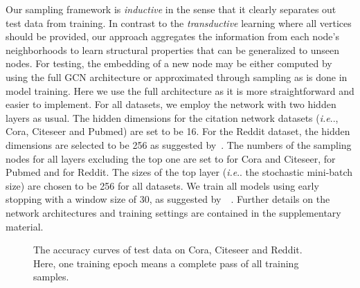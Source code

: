 \documentclass{article}
\makeatletter
\DeclareRobustCommand\onedot{\futurelet\@let@token\@onedot}
\def\@onedot{\ifx\@let@token.\else.\null\fi\xspace}
\def\ie{\emph{i.e}\onedot} \def\Ie{\emph{I.e}\onedot}
\makeatother
\begin{document}
Our sampling framework is \emph{inductive} in the sense that it clearly separates out test data from training. In contrast to the \emph{transductive} learning where all vertices should be provided, our approach aggregates the information from each node's neighborhoods to learn structural properties that can be generalized to unseen nodes.
For testing, the embedding of a new node may be either computed by using the full GCN architecture or approximated through sampling as is done in model training. Here we use the full architecture as it is more straightforward and easier to implement.
For all datasets, we employ the network with two hidden layers as usual. The hidden dimensions for the citation network datasets (\ie, Cora, Citeseer and Pubmed) are set to be 16. For the Reddit dataset, the hidden dimensions are selected to be 256 as suggested by~\cite{hamilton2017inductive}.
The numbers of the sampling nodes for all layers excluding the top one are set to  for Cora and Citeseer,  for Pubmed and  for Reddit. The sizes of the top layer (\ie the stochastic mini-batch size) are chosen to be 256 for all datasets.
We train all models using early stopping with a window size of 30, as suggested by~~\cite{kipf2016semi}.
Further details on the network architectures and training settings are contained in the supplementary material.


\begin{figure}[!t]
\begin{center}
\caption{The accuracy curves of test data on Cora, Citeseer and Reddit. Here, one training epoch means a complete pass of all training samples.}
\label{Fig:sampling}
\end{center}
\vskip -0.2in
\end{figure}
\end{document}
